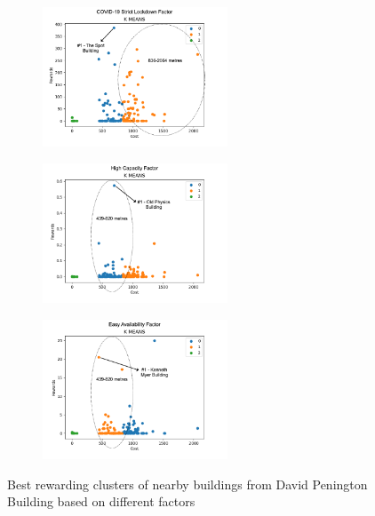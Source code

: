 \begin{figure}[H]
\centering
\begin{subfigure}[b]{0.30\textwidth}
  \centering
  \includegraphics[width=5.5cm,keepaspectratio=true]{resources/images/spatial-mr/david-mr/david_04.png}
\end{subfigure}
\begin{subfigure}[b]{0.30\textwidth}
  \centering
  \includegraphics[width=5.5cm,keepaspectratio=true]{resources/images/spatial-mr/david-mr/david_05.png}
\end{subfigure}
\begin{subfigure}[b]{0.30\textwidth}
  \centering
  \includegraphics[width=5.5cm,keepaspectratio=true]{resources/images/spatial-mr/david-mr/david_06.png}
\end{subfigure}
\caption{Best rewarding clusters of nearby buildings from David Penington Building based on different factors}
\label{fig:david-mr-other-factors}
\end{figure}


